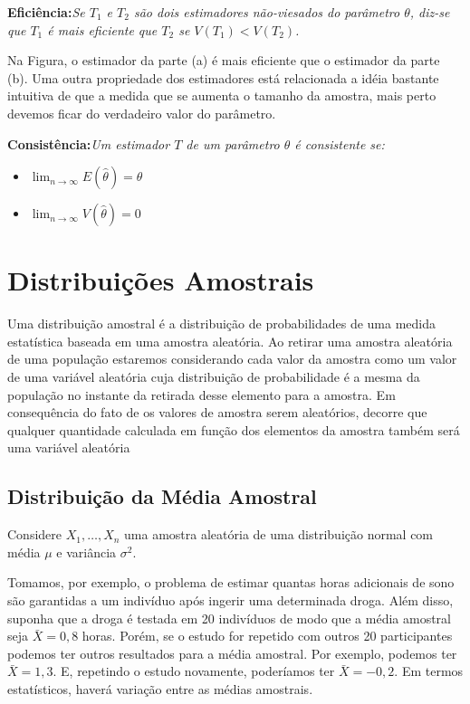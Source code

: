 \documentclass[
]{book}
\providecommand{\tightlist}{%
  \setlength{\itemsep}{0pt}\setlength{\parskip}{0pt}}
\begin{document}
\textbf{Eficiência:}\emph{Se $T_1$ e $T_2$ são dois estimadores não-viesados do parâmetro $\theta$, diz-se que $T_1$ é mais eficiente que $T_2$ se $V(T_1)<V(T_2)$.}

Na Figura, o estimador da parte (a) é mais eficiente que o estimador da parte (b). Uma outra propriedade dos estimadores está relacionada a idéia bastante intuitiva de que a medida que se aumenta o tamanho da amostra, mais perto devemos ficar do verdadeiro valor do parâmetro.

\textbf{Consistência:}\emph{Um estimador $T$ de um parâmetro $\theta$ é consistente se:}

\begin{itemize}
\tightlist
\item
  \(\lim_{n\to\infty} E(\hat\theta)=\theta\)
\item
  \(\lim_{n\to\infty} V(\hat\theta)=0\)
\end{itemize}

\hypertarget{distribuiuxe7uxf5es-amostrais-1}{%
\chapter{Distribuições Amostrais}\label{distribuiuxe7uxf5es-amostrais-1}}

Uma distribuição amostral é a distribuição de probabilidades de uma medida estatística baseada em uma amostra aleatória. Ao retirar uma amostra aleatória de uma população estaremos considerando cada valor da amostra como um valor de uma variável aleatória cuja distribuição de probabilidade é a mesma da população no instante da retirada desse elemento para a amostra. Em consequência do fato de os valores de amostra serem aleatórios, decorre que qualquer quantidade calculada em função dos elementos da amostra também será uma variável aleatória

\hypertarget{distribuiuxe7uxe3o-da-muxe9dia-amostral}{%
\section{Distribuição da Média Amostral}\label{distribuiuxe7uxe3o-da-muxe9dia-amostral}}

Considere \(X_1,\ldots,X_n\) uma amostra aleatória de uma distribuição normal com média \(\mu\) e variância \(\sigma^2\).

Tomamos, por exemplo, o problema de estimar quantas horas adicionais de sono são garantidas a um indivíduo após ingerir uma determinada droga. Além disso, suponha que a droga é testada em 20 indivíduos de modo que a média amostral seja \(\bar X=0,8\) horas. Porém, se o estudo for repetido com outros 20 participantes podemos ter outros resultados para a média amostral. Por exemplo, podemos ter \(\bar X=1,3\). E, repetindo o estudo novamente, poderíamos ter \(\bar X=-0,2\). Em termos estatísticos, haverá variação entre as médias amostrais.
\end{document}
